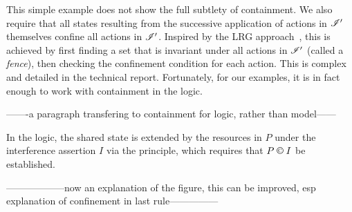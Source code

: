 This simple example does not show the full subtlety of containment. We  also require that all states resulting from the successive
application of actions in $\mathscr{I}'$ themselves confine all actions in
$\mathscr{I}'$. 
Inspired by the LRG approach~\cite{lrg}, this is achieved by
first finding a set that is invariant under all actions in $\mathscr{I}'$
(called a \emph{fence}), then checking the confinement condition for
each action. This is complex and detailed in the technical
report. Fortunately, for our examples,  it is in fact enough to work with containment in the
logic. 

-------a paragraph transfering to containment for logic, rather than model------


In the logic, the shared state is extended by the resources in
$P$ under the interference assertion $I$ via the \extendRule principle,
which requires that $P\containI I$ be
established. 

------------------now an explanation of the figure, this can be
improved, esp explanation of  confinement in last rule---------------


